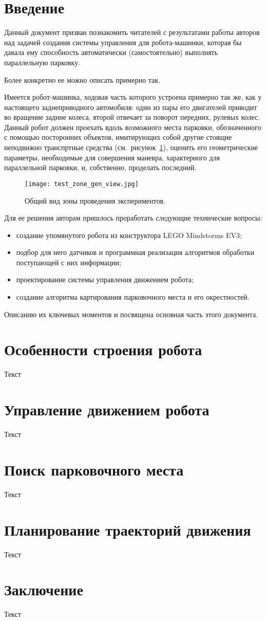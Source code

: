 \section*{Введение}
Данный документ призван познакомить читателей с результатами работы авторов над задачей создания системы управления для робота-машинки, которая бы давала ему способность автоматически (самостоятельно) выполнять параллельную парковку.

Более конкретно ее можно описать примерно так.

Имеется робот-машинка, ходовая часть которого устроена примерно так же, как у настоящего заднеприводного автомобиля: один из пары его двигателей приводит во вращение задние колеса, второй отвечает за поворот передних, рулевых колес.
Данный робот должен проехать вдоль возможного места парковки, обозначенного с помощью посторонних объектов, имитирующих собой другие стоящие неподвижно транспртные средства (см.~рисунок~\ref{img_test_zone_gen_view}), оценить его геометрические параметры, необходимые для совершения маневра, характерного для параллельной парковки, и, собственно, проделать последний.

\begin{figure}[h]
    \centering
    \texttt{[image: test\_zone\_gen\_view.jpg]}
    \caption{Общий вид зоны проведения экспериментов.}
    \label{img_test_zone_gen_view}
\end{figure}

Для ее решения авторам пришлось проработать следующие технические вопросы:
\begin{itemize}
    \item создание упомянутого робота из конструктора LEGO Mindstorms EV3;
    \item подбор для него датчиков и программная реализация алгоритмов обработки поступающей с них информации;
    \item проектирование системы управления движением робота;
    \item создание алгоритма картирования парковочного места и его окрестностей.
\end{itemize}
Описанию их ключевых моментов и посвящена основная часть этого документа.


\newpage
\section{Особенности строения робота}
Текст


\newpage
\section{Управление движением робота}
Текст


\newpage
\section{Поиск парковочного места}
Текст


\newpage
\section{Планирование траекторий движения}
Текст


\newpage
\section*{Заключение}
Текст
